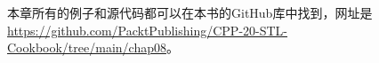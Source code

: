 



本章所有的例子和源代码都可以在本书的GitHub库中找到，网址是\url{https://github.com/PacktPublishing/CPP-20-STL-Cookbook/tree/main/chap08}。